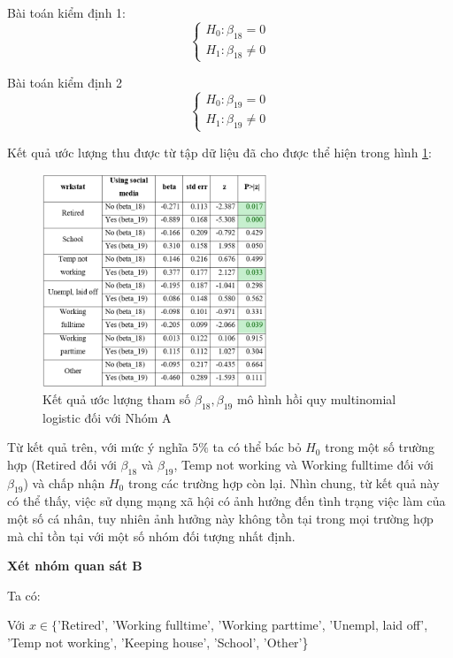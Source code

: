Bài toán kiểm định 1:
$$
\left\{\begin{array}{l}
H_{0}: \beta_{18}=0 \\
H_{1}: \beta_{18} \neq 0
\end{array}\right.
$$

Bài toán kiểm định 2
$$
\left\{\begin{array}{l}
H_{0}: \beta_{19}=0 \\
H_{1}: \beta_{19} \neq 0
\end{array}\right.
$$

Kết quả ước lượng thu được từ tập dữ liệu đã cho được thể hiện trong hình \ref{fig:beta1819}:

\begin{figure}[h!]
    \centering
    \includegraphics[width=0.6\textwidth]{figures/beta1819.png}
    \caption{Kết quả ước lượng tham số $\beta_{18}, \beta_{19}$ mô hình hồi quy multinomial logistic đối với Nhóm A}
    \label{fig:beta1819}
\end{figure}

Từ kết quả trên, với mức ý nghĩa $5 \%$ ta có thể bác bỏ $H_{0}$ trong một số trường hợp (Retired đối với $\beta_{18}$ và $\beta_{19}$, Temp not working và Working fulltime đối với $\beta_{19}$) và chấp nhận $H_{0}$ trong các trường hợp còn lại. Nhìn chung, từ kết quả này có thể thấy, việc sử dụng mạng xã hội có ảnh hưởng đến tình trạng việc làm của một số cá nhân, tuy nhiên ảnh hưởng này không tồn tại trong mọi trường hợp mà chỉ tồn tại với một số nhóm đối tượng nhất định.


\textbf{Xét nhóm quan sát B}

Ta có:


Với $x \in\{$'Retired', 'Working fulltime', 'Working parttime', 'Unempl, laid off', 'Temp not working', 'Keeping house', 'School', 'Other'\}

